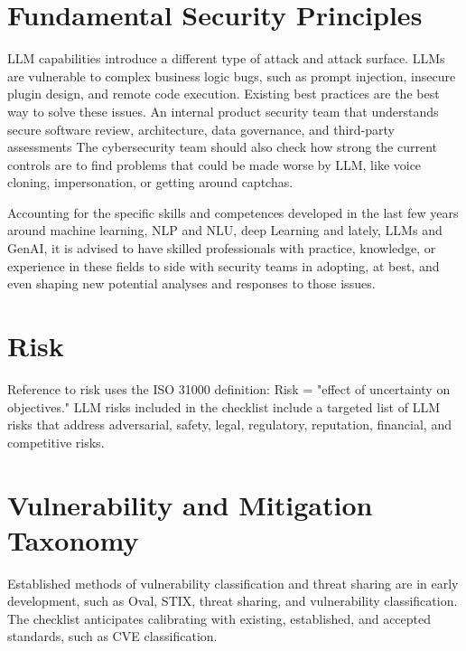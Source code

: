 \clearpage

\section{Fundamental Security Principles}

LLM capabilities introduce a different type of attack and attack surface. LLMs
are vulnerable to complex business logic bugs, such as prompt injection,
insecure plugin design, and remote code execution. Existing best practices are
the best way to solve these issues. An internal product security team that
understands secure software review, architecture, data governance, and
third-party assessments The cybersecurity team should also check how strong
the current controls are to find problems that could be made worse by LLM,
like voice cloning, impersonation, or getting around captchas.

Accounting for the specific skills and competences developed in the last few
years around machine learning, NLP and NLU, deep Learning and lately, LLMs and
GenAI, it is advised to have skilled professionals with practice, knowledge, or
experience in these fields to side with security teams in adopting, at best,
and even shaping new potential analyses and responses to those issues.

\section{Risk}

Reference to risk uses the ISO 31000 definition: Risk = "effect of uncertainty on objectives."
LLM risks included in the checklist include a targeted list of LLM risks that
address adversarial, safety, legal, regulatory, reputation, financial, and competitive risks.

\section{Vulnerability and Mitigation Taxonomy}

Established methods of vulnerability classification and threat sharing are in
early development, such as Oval, STIX, threat sharing, and vulnerability
classification. The checklist anticipates calibrating with existing,
established, and accepted standards, such as CVE classification.
